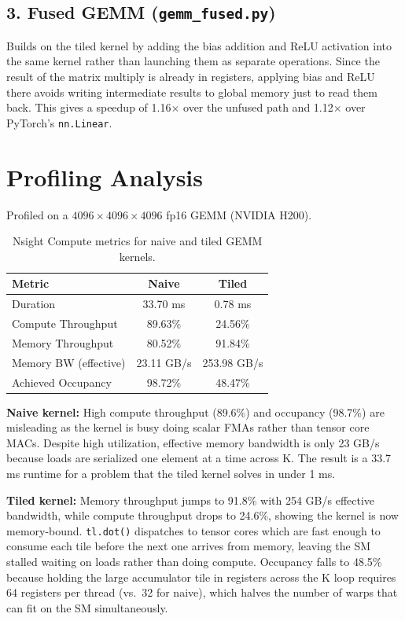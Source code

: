\documentclass[11pt]{article}
\begin{document}
\subsection*{3. Fused GEMM (\texttt{gemm\_fused.py})}

Builds on the tiled kernel by adding the bias addition and ReLU activation into the same
kernel rather than launching them as separate operations. Since the result of the matrix
multiply is already in registers, applying bias and ReLU there avoids writing intermediate
results to global memory just to read them back. This gives a speedup
of 1.16$\times$ over the unfused path and 1.12$\times$ over PyTorch's \texttt{nn.Linear}.

\section*{Profiling Analysis}

Profiled on a $4096 \times 4096 \times 4096$ fp16 GEMM (NVIDIA H200).

\begin{table}[h]
\centering
\begin{tabular}{lcc}
\toprule
\textbf{Metric} & \textbf{Naive} & \textbf{Tiled} \\
\midrule
Duration              & 33.70 ms   & 0.78 ms     \\
Compute Throughput    & 89.63\%    & 24.56\%     \\
Memory Throughput     & 80.52\%    & 91.84\%     \\
Memory BW (effective) & 23.11 GB/s & 253.98 GB/s \\
Achieved Occupancy    & 98.72\%    & 48.47\%     \\
\bottomrule
\end{tabular}
\caption{Nsight Compute metrics for naive and tiled GEMM kernels.}
\end{table}

\textbf{Naive kernel:} High compute throughput (89.6\%) and occupancy (98.7\%) are
misleading as the kernel is busy doing scalar FMAs rather than tensor core MACs. Despite
high utilization, effective memory bandwidth is only 23 GB/s because loads are serialized
one element at a time across K. The result is a 33.7 ms runtime for a problem that the
tiled kernel solves in under 1 ms.

\textbf{Tiled kernel:} Memory throughput jumps to 91.8\% with 254 GB/s effective
bandwidth, while compute throughput drops to 24.6\%, showing the kernel is now
memory-bound. \texttt{tl.dot()} dispatches to tensor cores which are fast enough to
consume each tile before the next one arrives from memory, leaving the SM stalled waiting
on loads rather than doing compute. Occupancy falls to 48.5\% because holding the large
accumulator tile in registers across the K loop requires 64 registers per thread (vs.\ 32
for naive), which halves the number of warps that can fit on the SM simultaneously.
\end{document}
